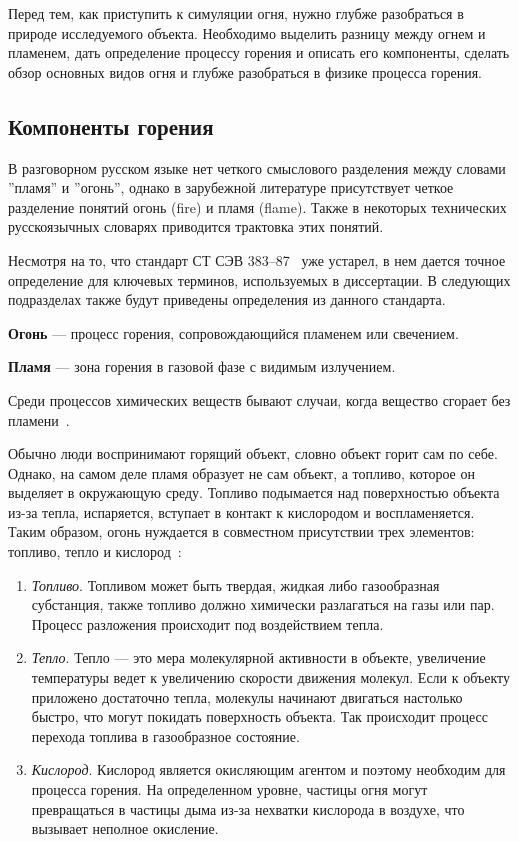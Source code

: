 Перед тем, как приступить к симуляции огня, нужно глубже разобраться в природе
исследуемого объекта. Необходимо выделить разницу между огнем и пламенем,
дать определение процессу горения и описать его компоненты, сделать обзор
основных видов огня и глубже разобраться в физике процесса горения.

\subsection{Компоненты горения}

В разговорном русском языке нет четкого смыслового разделения между словами
''пламя'' и ''огонь''\cite{WikiFlame}, однако в зарубежной литературе
присутствует четкое разделение понятий огонь (fire) и пламя (flame). Также в
некоторых технических русскоязычных словарях приводится трактовка этих
понятий.

Несмотря на то, что стандарт СТ СЭВ 383--87~\cite{383-87} уже устарел, в нем
дается точное определение для ключевых терминов, используемых в диссертации. В
следующих подразделах также будут приведены определения из данного стандарта.

\textbf{Огонь} --- процесс горения, сопровождающийся пламенем или свечением.

\textbf{Пламя} --- зона горения в газовой фазе с видимым излучением.

Среди процессов химических веществ бывают случаи, когда вещество сгорает без
пламени~\cite{WikiFire}.

Обычно люди воспринимают горящий объект, словно объект горит сам по себе.
Однако, на самом деле пламя образует не сам объект, а топливо, которое он
выделяет в окружающую среду. Топливо подымается над поверхностью объекта из-за
тепла, испаряется, вступает в контакт к кислородом и воспламеняется. Таким
образом, огонь нуждается в совместном присутствии трех элементов: топливо, тепло
и кислород~\cite{USArmy}:
\begin{enumerate}
    \item \emph{Топливо}. Топливом может быть твердая, жидкая либо газообразная
        субстанция, также топливо должно химически разлагаться на газы или
        пар. Процесс разложения происходит под воздействием тепла.
    \item \emph{Тепло}. Тепло --- это мера молекулярной активности в объекте,
        увеличение температуры ведет к увеличению скорости движения молекул.
        Если к объекту приложено достаточно тепла, молекулы начинают двигаться
        настолько быстро, что могут покидать поверхность объекта. Так происходит
        процесс перехода топлива в газообразное состояние.
    \item \emph{Кислород}. Кислород является окисляющим агентом и поэтому
        необходим для процесса горения. На определенном уровне, частицы огня
        могут превращаться в частицы дыма из-за нехватки кислорода в воздухе,
        что вызывает неполное окисление.
\end{enumerate}

